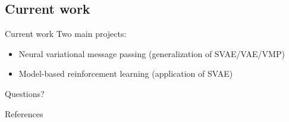 \documentclass[10pt, compress]{beamer}
\begin{document}
\subsection{Current work}
\begin{frame}{Current work}
  \pause
  Two main projects:
  \begin{itemize}
      \pause
    \item Neural variational message passing (generalization of SVAE/VAE/VMP)
      \pause
    \item Model-based reinforcement learning (application of SVAE)
  \end{itemize}
\end{frame}
\begin{frame}[standout]
  Questions?
\end{frame}

\appendix
\begin{frame}[allowframebreaks]{References}
  
  
\end{frame}
\end{document}

